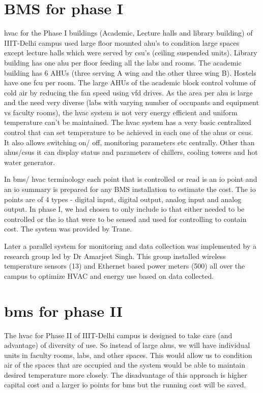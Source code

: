 \documentclass[letterpaper,11pt]{report}
\begin{document}
\section{BMS for phase I}
\ac{hvac} for the Phase I buildings (Academic, Lecture halls and library building) of IIIT-Delhi campus used large floor mounted \ac{ahu}'s to condition large spaces except lecture halls which were served by \ac{csu}'s (ceiling suspended units). Library building has one \ac{ahu} per floor feeding all the labs and rooms. The academic building has 6 AHUs (three serving A wing and the other three wing B). Hostels have one \ac{fcu} per room. The large AHUs of the academic block control volume of cold air by reducing the fan speed using \ac{vfd} drives. As the area per \ac{ahu} is large and the need very diverse (labs with varying number of occupants and equipment vs faculty rooms), the \ac{hvac} system is not very energy efficient and uniform temperature can't be maintained. The \ac{hvac} system has a very basic centralized control that can set temperature to be achieved in each one of the \ac{ahu}s or \ac{csu}s. It also allows switching on/ off, monitoring parameters etc centrally. Other than \ac{ahu}s/\ac{csu}s it can display status and parameters of chillers, cooling towers and hot water generator.
\par
In \ac{bms}/ \ac{hvac} terminology each point that is controlled or read is an \ac{io} point and an \ac{io} summary is prepared for any BMS installation to estimate the cost. The \ac{io} points are of 4 types - digital input, digital output, analog input and analog output. In phase I, we had chosen to only include \ac{io} that either needed to be controlled or the \ac{io} that were to be sensed and used for controlling to contain cost. The system was provided by Trane.
\par
Later a parallel system for monitoring and data collection was implemented by a research group led by Dr Amarjeet Singh. This group installed wireless temperature sensors (13) and Ethernet based power meters (500) all over the campus to optimize HVAC and energy use based on data collected.
\pagebreak
\section{\ac{bms} for phase II}
The \ac{hvac} for Phase II of IIIT-Delhi campus is designed to take care (and advantage) of diversity of use. So instead of large \ac{ahu}s, we will have individual units in faculty rooms, labs, and other spaces. This would allow us to condition air of the spaces that are occupied and the system would be able to maintain desired temperature more closely. The disadvantage of this approach is higher capital cost and a larger \ac{io} points for \ac{bms} but the running cost will be saved.
\end{document}
